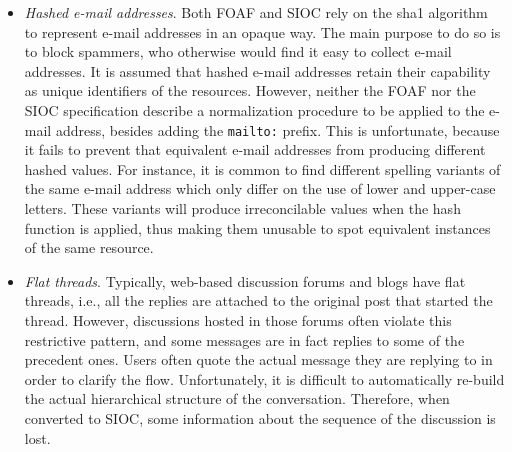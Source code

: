 \documentclass{../templates/www2008-submission}
\begin{document}
\begin{itemize}
        A comprehensive knowledge base of FOAF descriptions is very
        useful in this tasks. However, this introduces another related issue:
        as anyone can create FOAF descriptions, there may exist more than
        one instance of \texttt{foaf:Person} to describe the same person.
        Consolidation of these instances is a similar problem to the
        one just described, and receives the name of "instance
        smushing"\footnote{\texttt{http://esw.w3.org/topic/RdfSmushing}}.
        For our experiments, we crawled a dataset 4,000 FOAF descriptions
        from Advogato\footnote{\texttt{http://www.advogato.org/}}, a social
        network for free software developers.

  \item \emph{Hashed e-mail addresses}. Both FOAF and SIOC
        rely on the sha1 algorithm~\cite{Eastlake2001} to represent
        e-mail addresses in an opaque way. The main purpose to do so
        is to block spammers, who otherwise would find it easy to collect
        e-mail addresses. It is
        assumed that hashed e-mail addresses retain their capability
        as unique identifiers of the resources. However, neither
        the FOAF nor the SIOC specification describe a normalization
        procedure to be applied to the e-mail address, besides adding
        the \texttt{mailto:} prefix. This is unfortunate, because it
        fails to prevent that equivalent
        e-mail addresses from producing different hashed values. For instance,
        it is common to find different spelling variants of the same
        e-mail address which only differ on the use of lower and upper-case
        letters. These variants will produce irreconcilable values
        when the hash function is applied, thus making them unusable
        to spot equivalent instances of the same resource.

  \item \emph{Flat threads}. Typically, web-based discussion forums and blogs
        have flat threads, i.e., all the replies are attached to the original
        post that started the thread. However, discussions hosted in those
        forums often violate this restrictive pattern, and some messages
        are in fact replies to some of the precedent ones. Users often
        quote the actual message they are replying to in order to clarify the
        flow. Unfortunately, it is difficult to automatically re-build
        the actual hierarchical structure of the conversation. Therefore,
        when converted to SIOC, some information about the sequence of
        the discussion is lost.


\end{itemize}
\end{document}
